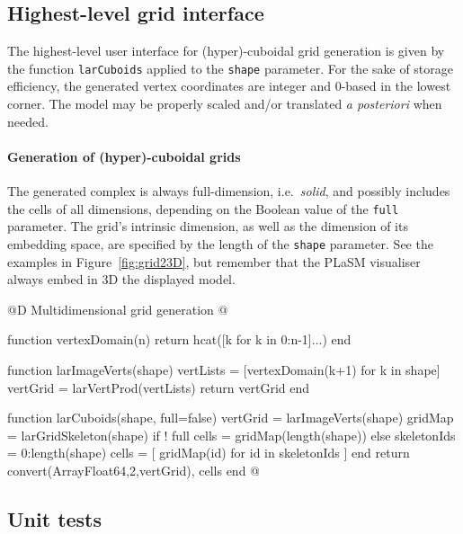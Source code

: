 \subsection{Highest-level grid interface}

The highest-level user interface for (hyper)-cuboidal grid generation is given by the function \texttt{larCuboids}  applied to the \texttt{shape} parameter.  
For the sake of storage efficiency, the generated vertex coordinates are integer and 0-based in the lowest corner. The model may be properly scaled and/or translated \emph{a posteriori} when needed.

\paragraph{Generation of (hyper)-cuboidal grids}

The generated complex is always full-dimension, i.e.~\emph{solid}, and possibly includes the cells of all dimensions, depending on the Boolean value of the \texttt{full} parameter.
The grid's intrinsic dimension, as well as the dimension of its embedding space, are specified by the length of the \texttt{shape} parameter. See the examples in Figure~\ref{fig:grid23D}, but remember that the PLaSM visualiser always embed in 3D the displayed model. 

@D Multidimensional grid generation
@{function vertexDomain(n)
	return hcat([k for k in 0:n-1]...)
end

function larImageVerts(shape)
	vertLists = [vertexDomain(k+1) for k in shape]
	vertGrid = larVertProd(vertLists)
	return vertGrid
end

function larCuboids(shape, full=false)
	vertGrid = larImageVerts(shape)
	gridMap = larGridSkeleton(shape)
	if ! full
		cells = gridMap(length(shape))
	else
		skeletonIds = 0:length(shape)
		cells = [ gridMap(id) for id in skeletonIds ]
	end
	return convert(Array{Float64,2},vertGrid), cells
end
@}



\subsection{Unit tests}


